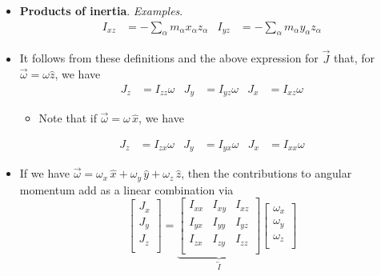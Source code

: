 \documentclass[../notes.tex]{subfiles}
\begin{document}
\begin{itemize}
\begin{itemize}
    \end{itemize}
    \item \textbf{Products of inertia}. \emph{Examples}.
    \begin{align*}
        I_{xz} &= -\sum_\alpha m_\alpha x_\alpha z_\alpha&
        I_{yz} &= -\sum_\alpha m_\alpha y_\alpha z_\alpha
    \end{align*}
    \item It follows from these definitions and the above expression for $\vec{J}$ that, for $\vec{\omega}=\omega\hat{z}$, we have
    \begin{align*}
        J_z &= I_{zz}\omega&
        J_y &= I_{yz}\omega&
        J_x &= I_{xz}\omega
    \end{align*}
    \begin{itemize}
        \item Note that if $\vec{\omega}=\omega\,\hat{x}$, we have
    \end{itemize}
    \begin{align*}
        J_z &= I_{zx}\omega&
        J_y &= I_{yx}\omega&
        J_x &= I_{xx}\omega
    \end{align*}
    \item If we have $\vec{\omega}=\omega_x\,\hat{x}+\omega_y\,\hat{y}+\omega_z\,\hat{z}$, then the contributions to angular momentum add as a linear combination via
    \begin{equation*}
        \begin{bmatrix}
            J_x\\
            J_y\\
            J_z\\
        \end{bmatrix}
        = \underbrace{
            \begin{bmatrix}
                I_{xx} & I_{xy} & I_{xz}\\
                I_{yx} & I_{yy} & I_{yz}\\
                I_{zx} & I_{zy} & I_{zz}\\
            \end{bmatrix}
        }_{\overleftrightarrow{I}}
        \begin{bmatrix}
            \omega_x\\
            \omega_y\\
            \omega_z\\
        \end{bmatrix}
    \end{equation*}
    \begin{itemize}

\end{itemize}
\end{itemize}
\end{document}
